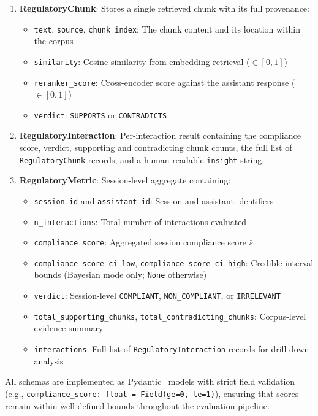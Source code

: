 \begin{enumerate}
    \item \textbf{RegulatoryChunk}: Stores a single retrieved chunk with its full provenance:
    \begin{itemize}
        \item \texttt{text}, \texttt{source}, \texttt{chunk\_index}: The chunk content and its location within the corpus
        \item \texttt{similarity}: Cosine similarity from embedding retrieval ($\in [0, 1]$)
        \item \texttt{reranker\_score}: Cross-encoder score against the assistant response ($\in [0, 1]$)
        \item \texttt{verdict}: \texttt{SUPPORTS} or \texttt{CONTRADICTS}
    \end{itemize}
    \item \textbf{RegulatoryInteraction}: Per-interaction result containing the compliance score, verdict, supporting and contradicting chunk counts, the full list of \texttt{RegulatoryChunk} records, and a human-readable \texttt{insight} string.
    \item \textbf{RegulatoryMetric}: Session-level aggregate containing:
    \begin{itemize}
        \item \texttt{session\_id} and \texttt{assistant\_id}: Session and assistant identifiers
        \item \texttt{n\_interactions}: Total number of interactions evaluated
        \item \texttt{compliance\_score}: Aggregated session compliance score $\bar{s}$
        \item \texttt{compliance\_score\_ci\_low}, \texttt{compliance\_score\_ci\_high}: Credible interval bounds (Bayesian mode only; \texttt{None} otherwise)
        \item \texttt{verdict}: Session-level \texttt{COMPLIANT}, \texttt{NON\_COMPLIANT}, or \texttt{IRRELEVANT}
        \item \texttt{total\_supporting\_chunks}, \texttt{total\_contradicting\_chunks}: Corpus-level evidence summary
        \item \texttt{interactions}: Full list of \texttt{RegulatoryInteraction} records for drill-down analysis
    \end{itemize}
\end{enumerate}

All schemas are implemented as Pydantic~\cite{pydantic2024} models with strict field validation (e.g., \texttt{compliance\_score: float = Field(ge=0, le=1)}), ensuring that scores remain within well-defined bounds throughout the evaluation pipeline.

